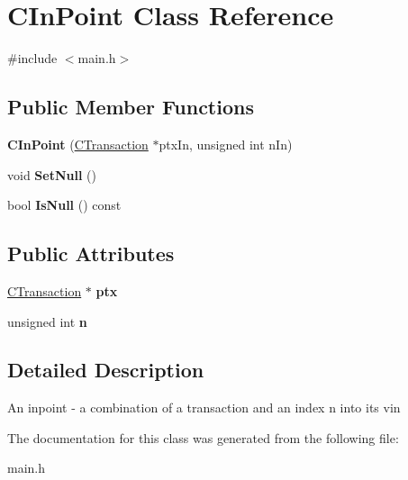 \hypertarget{class_c_in_point}{}\section{C\+In\+Point Class Reference}
\label{class_c_in_point}


{\ttfamily \#include $<$main.\+h$>$}

\subsection*{Public Member Functions}
\begin{DoxyCompactItemize}
\item 
\mbox{\label{class_c_in_point_ac054c350f76431079350e9e5ac18fb0f}} 
{\bfseries C\+In\+Point} (\mbox{\hyperlink{class_c_transaction}{C\+Transaction}} $\ast$ptx\+In, unsigned int n\+In)
\item 
\mbox{\label{class_c_in_point_af92945e76098bd920049f9f85a730e22}} 
void {\bfseries Set\+Null} ()
\item 
\mbox{\label{class_c_in_point_a959a51348c217c82773bbedee016af76}} 
bool {\bfseries Is\+Null} () const
\end{DoxyCompactItemize}
\subsection*{Public Attributes}
\begin{DoxyCompactItemize}
\item 
\mbox{\label{class_c_in_point_a2af1553adce95fa8504eb2979cbc9cf3}} 
\mbox{\hyperlink{class_c_transaction}{C\+Transaction}} $\ast$ {\bfseries ptx}
\item 
\mbox{\label{class_c_in_point_afd43eee38268aac7ff91d065697032ad}} 
unsigned int {\bfseries n}
\end{DoxyCompactItemize}


\subsection{Detailed Description}
An inpoint -\/ a combination of a transaction and an index n into its vin 

The documentation for this class was generated from the following file\+:\begin{DoxyCompactItemize}
\item 
main.\+h\end{DoxyCompactItemize}
